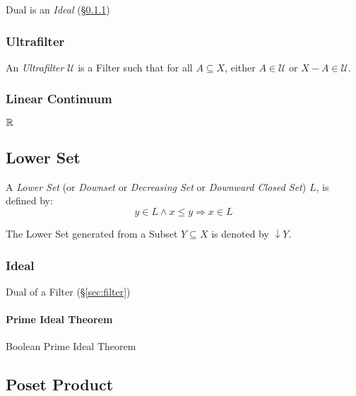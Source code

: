 Dual is an \emph{Ideal} (\S\ref{sec:order_ideal})



\subsubsection{Ultrafilter}\label{sec:ultrafilter}

An \emph{Ultrafilter} $\mathcal{U}$ is a Filter such that for all $A
\subseteq X$, either $A \in \mathcal{U}$ or $X - A \in \mathcal{U}$.



\subsubsection{Linear Continuum}\label{sec:linear_continuum}

$\mathbb{R}$



\subsection{Lower Set}\label{sec:lower_set}

A \emph{Lower Set} (or \emph{Downset} or \emph{Decreasing Set} or
\emph{Downward Closed Set}) $L$, is defined by:
\[
  y \in L \wedge x \leq y \Rightarrow x \in L
\]

The Lower Set generated from a Subset $Y \subseteq X$ is denoted by
$\downarrow Y$.



\subsubsection{Ideal}\label{sec:order_ideal}

Dual of a Filter (\S\ref{sec:filter})



\paragraph{Prime Ideal Theorem}\label{sec:prime_ideal}\hfill

Boolean Prime Ideal Theorem



\subsection{Poset Product}\label{sec:poset_product}

